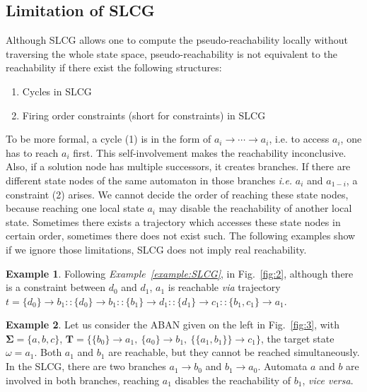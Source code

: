 \documentclass{article}
\newcommand{\acm}[3]{\{#1\}\rightarrow#3}
\theoremstyle{definition}
\newtheorem{example}{Example}
\begin{document}
\subsection{Limitation of SLCG}\label{limitation}
Although SLCG allows one to compute the pseudo-reachability locally without traversing the whole state space, pseudo-reachability is not equivalent to the reachability if there exist the following structures:
\begin{enumerate}[label={(\arabic*)}]
\item Cycles in SLCG
\item Firing order constraints (short for constraints) in SLCG
\end{enumerate}
To be more formal, a cycle (1) is in the form of $a_i\to\cdots\to a_i$, i.e. to access $a_i$, one has to reach $a_i$ first. This self-involvement makes the reachability inconclusive. 
Also, if a solution node has multiple successors, it creates branches.
If there are different state nodes of the same automaton in those branches \textit{i.e.} $a_i$ and $a_{1-i}$, a constraint (2) arises. 
We cannot decide the order of reaching these state nodes, because reaching one local state $a_i$ may disable the reachability of another local state.
Sometimes there exists a trajectory which accesses these state nodes in certain order, sometimes there does not exist such.
The following examples show if we ignore those limitations, SLCG does not imply real reachability.


\begin{example}\label{example:reach}
Following \textit{Example~\ref{example:SLCG}}, in Fig.~\ref{fig:2}, although there is a constraint between $d_0$ and $d_1$, $a_1$ is reachable \textit{via} trajectory $t=\acm{d_0}{b_0}{b_1}::\acm{d_0}{b_0}{b_1}::\acm{b_1}{d_0}{d_1}::\acm{d_1}{c_0}{c_1}::\acm{b_1,c_1}{a_0}{a_1}$.
\end{example}

\begin{example}\label{example:unreach}
Let us consider the ABAN given on the left in Fig.~\ref{fig:3}, with $\mathbf{\Sigma}=\{a,b,c\}$, $\mathbf{T}=\{\acm{b_0}{a_0}{a_1},\ \acm{a_0}{b_0}{b_1},\ \acm{\{a_1,b_1\}}{c_0}{c_1}\}$, the target state $\omega=a_1$. 
Both $a_1$ and $b_1$ are reachable, but they cannot be reached simultaneously.
In the SLCG, there are two branches $a_1\to b_0$ and $b_1\to a_0$.
Automata $a$ and $b$ are involved in both branches, reaching $a_1$ disables the reachability of $b_1$, \textit{vice versa}.
\end{example}
\end{document}
